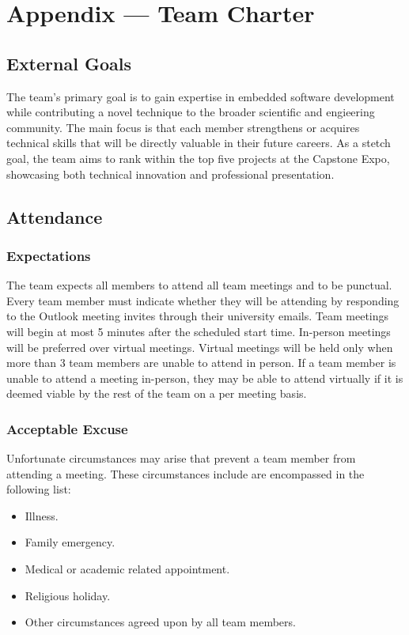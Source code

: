 \documentclass{article}
\begin{document}
\newpage{}

\section*{Appendix --- Team Charter}

\subsection*{External Goals}

The team's primary goal is to gain expertise in embedded software development while contributing a novel technique to the broader scientific and engieering community.
The main focus is that each member strengthens or acquires technical skills that will be directly valuable in their future careers.
As a stetch goal, the team aims to rank within the top five projects at the Capstone Expo, showcasing both technical innovation and professional presentation.

\subsection*{Attendance}

\subsubsection*{Expectations}

The team expects all members to attend all team meetings and to be punctual. Every team member must indicate whether they will be attending 
by responding to the Outlook meeting invites through their university emails. Team meetings 
will begin at most 5 minutes after the scheduled start time. In-person meetings will be preferred over virtual meetings.
Virtual meetings will be held only when more than 3 team members are unable to attend in person. If a team member is unable to 
attend a meeting in-person, they may be able to attend virtually if it is deemed viable by the rest of the team on a per meeting basis.

\subsubsection*{Acceptable Excuse}

Unfortunate circumstances may arise that prevent a team member from attending a meeting.
These circumstances include are encompassed in the following list:
\begin{itemize}
  \item Illness.
  \item Family emergency.
  \item Medical or academic related appointment.
  \item Religious holiday.
  \item Other circumstances agreed upon by all team members.
\end{itemize}
\end{document}
